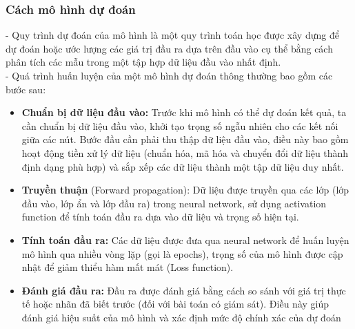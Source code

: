 \subsubsection{Cách mô hình dự đoán}
- Quy trình dự đoán của mô hình là một quy trình toán học được xây dựng để dự đoán hoặc ước lượng các giá trị đầu ra dựa trên đầu vào cụ thể bằng cách phân tích các mẫu trong một tập hợp dữ liệu đầu vào nhất định.
\\- Quá trình huấn luyện của một mô hình dự đoán thông thường bao gồm các bước sau:
\begin{itemize}
    \item \textbf{Chuẩn bị dữ liệu đầu vào:} Trước khi mô hình có thể dự đoán kết quả, ta cần chuẩn bị dữ liệu đầu vào, khởi tạo trọng số ngẫu nhiên cho các kết nối giữa các nút. Bước đầu cần phải thu thập dữ liệu đầu vào, điều này bao gồm hoạt động tiền xử lý dữ liệu (chuẩn hóa, mã hóa và chuyển đổi dữ liệu thành định dạng phù hợp) và sắp xếp các dữ liệu thành một tập dữ liệu duy nhất. 
    \item \textbf{Truyền thuận} (Forward propagation): Dữ liệu được truyền qua các lớp (lớp đầu vào, lớp ẩn và lớp đầu ra) trong neural network, sử dụng activation function để tính toán đầu ra dựa vào dữ liệu và trọng số hiện tại. 
    \item \textbf{Tính toán đầu ra:} Các dữ liệu được đưa qua neural network để huấn luyện mô hình qua nhiều vòng lặp (gọi là epochs), trọng số của mô hình được cập nhật để giảm thiểu hàm mất mát (Loss function). 
    \item \textbf{Đánh giá đầu ra:} Đầu ra được đánh giá bằng cách so sánh với giá trị thực tế hoặc nhãn đã biết trước (đối với bài toán có giám sát). Điều này giúp đánh giá hiệu suất của mô hình và xác định mức độ chính xác của dự đoán
\end{itemize}
